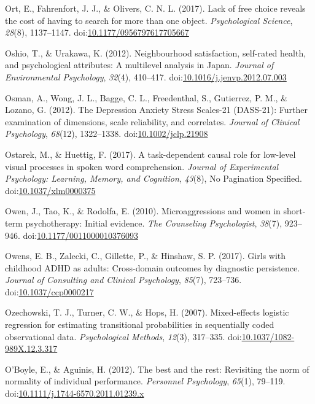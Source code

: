 \documentclass[english,man]{apa6}
\theoremstyle{definition}
\theoremstyle{definition}
\theoremstyle{definition}
\theoremstyle{remark}
\begin{document}
\hypertarget{ref-Ort2017}{}
Ort, E., Fahrenfort, J. J., \& Olivers, C. N. L. (2017). Lack of free
choice reveals the cost of having to search for more than one object.
\emph{Psychological Science}, \emph{28}(8), 1137--1147.
doi:\href{https://doi.org/10.1177/0956797617705667}{10.1177/0956797617705667}

\hypertarget{ref-Oshio2012}{}
Oshio, T., \& Urakawa, K. (2012). Neighbourhood satisfaction, self-rated
health, and psychological attributes: A multilevel analysis in Japan.
\emph{Journal of Environmental Psychology}, \emph{32}(4), 410--417.
doi:\href{https://doi.org/10.1016/j.jenvp.2012.07.003}{10.1016/j.jenvp.2012.07.003}

\hypertarget{ref-Osman2012}{}
Osman, A., Wong, J. L., Bagge, C. L., Freedenthal, S., Gutierrez, P. M.,
\& Lozano, G. (2012). The Depression Anxiety Stress Scales-21 (DASS-21):
Further examination of dimensions, scale reliability, and correlates.
\emph{Journal of Clinical Psychology}, \emph{68}(12), 1322--1338.
doi:\href{https://doi.org/10.1002/jclp.21908}{10.1002/jclp.21908}

\hypertarget{ref-Ostarek2017}{}
Ostarek, M., \& Huettig, F. (2017). A task-dependent causal role for
low-level visual processes in spoken word comprehension. \emph{Journal
of Experimental Psychology: Learning, Memory, and Cognition},
\emph{43}(8), No Pagination Specified.
doi:\href{https://doi.org/10.1037/xlm0000375}{10.1037/xlm0000375}

\hypertarget{ref-Owen2010}{}
Owen, J., Tao, K., \& Rodolfa, E. (2010). Microaggressions and women in
short-term psychotherapy: Initial evidence. \emph{The Counseling
Psychologist}, \emph{38}(7), 923--946.
doi:\href{https://doi.org/10.1177/0011000010376093}{10.1177/0011000010376093}

\hypertarget{ref-Owens2017a}{}
Owens, E. B., Zalecki, C., Gillette, P., \& Hinshaw, S. P. (2017). Girls
with childhood ADHD as adults: Cross-domain outcomes by diagnostic
persistence. \emph{Journal of Consulting and Clinical Psychology},
\emph{85}(7), 723--736.
doi:\href{https://doi.org/10.1037/ccp0000217}{10.1037/ccp0000217}

\hypertarget{ref-Ozechowski2007}{}
Ozechowski, T. J., Turner, C. W., \& Hops, H. (2007). Mixed-effects
logistic regression for estimating transitional probabilities in
sequentially coded observational data. \emph{Psychological Methods},
\emph{12}(3), 317--335.
doi:\href{https://doi.org/10.1037/1082-989X.12.3.317}{10.1037/1082-989X.12.3.317}

\hypertarget{ref-OBoyle2012}{}
O'Boyle, E., \& Aguinis, H. (2012). The best and the rest: Revisiting
the norm of normality of individual performance. \emph{Personnel
Psychology}, \emph{65}(1), 79--119.
doi:\href{https://doi.org/10.1111/j.1744-6570.2011.01239.x}{10.1111/j.1744-6570.2011.01239.x}
\end{document}
